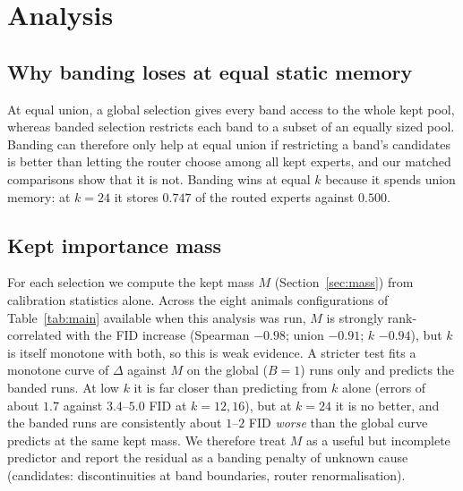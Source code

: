 \section{Analysis}\label{sec:analysis}

\subsection{Why banding loses at equal static memory}
At equal union, a global selection gives every band access to the whole kept pool, whereas banded selection restricts each band to a subset of an equally sized pool. Banding can therefore only help at equal union if restricting a band's candidates is better than letting the router choose among all kept experts, and our matched comparisons show that it is not. Banding wins at equal $k$ because it spends union memory: at $k=24$ it stores $0.747$ of the routed experts against $0.500$.

\subsection{Kept importance mass}\label{sec:mass-results}
For each selection we compute the kept mass $M$ (Section~\ref{sec:mass}) from calibration statistics alone. Across the eight animals configurations of Table~\ref{tab:main} available when this analysis was run, $M$ is strongly rank-correlated with the FID increase (Spearman $-0.98$; union $-0.91$; $k$ $-0.94$), but $k$ is itself monotone with both, so this is weak evidence.
A stricter test fits a monotone curve of $\Delta$ against $M$ on the global ($B=1$) runs only and predicts the banded runs. At low $k$ it is far closer than predicting from $k$ alone (errors of about $1.7$ against $3.4$--$5.0$ FID at $k=12,16$), but at $k=24$ it is no better, and the banded runs are consistently about $1$--$2$ FID \emph{worse} than the global curve predicts at the same kept mass. We therefore treat $M$ as a useful but incomplete predictor and report the residual as a banding penalty of unknown cause (candidates: discontinuities at band boundaries, router renormalisation).

